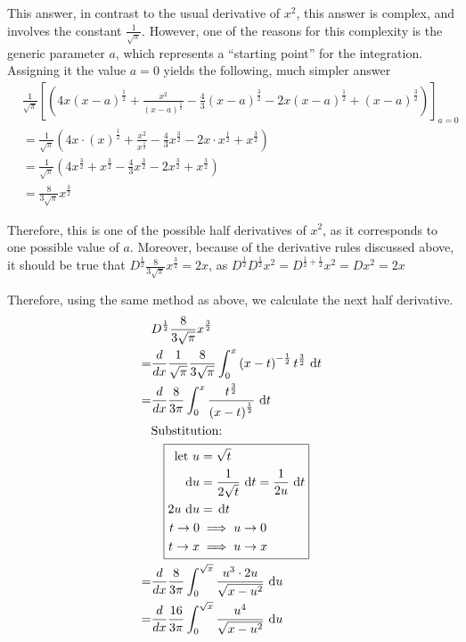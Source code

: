 \documentclass{article}
\DeclareMathOperator{\di}{\,d\!}
\newcommand*\Eval[3]{\left[#1\right]_{#2}^{#3}}
\newcommand{\IntSub}[1]{
{\textup{Substitution:}} \\
&\quad
\boxed{\begin{aligned}
		#1
\end{aligned}}
}
\begin{document}
This answer, in contrast to the usual derivative of $x^2$, this answer is
complex, and involves the constant $\frac{1}{\sqrt{\pi}}$. However, one of the
reasons for this complexity is the generic parameter $a$, which represents a
``starting point'' for the integration. Assigning it the value $a=0$ yields the following, much
simpler answer
\begin{align*}
	&\frac{1}{\sqrt{\pi}} \Eval{\left(4x\left(x-a\right)^\frac{1}{2} +
							   \frac{x^2}{\left(x-a\right)^\frac{1}{2}} -
							   \frac{4}{3}\left(x-a\right)^\frac{3}{2} -
							   2x\left(x-a\right)^\frac{1}{2} +
						       \left(x-a\right)^\frac{3}{2}\right)}
							   {a=0}{}\\
	&=\frac{1}{\sqrt{\pi}} \left(4x\cdot\left(x\right)^\frac{1}{2} +
							   \frac{x^2}{x^\frac{1}{2}} -
							   \frac{4}{3}x^\frac{3}{2} -
							   2x \cdot x^\frac{1}{2} +
						       x^\frac{3}{2}\right) \\
	&=\frac{1}{\sqrt{\pi}} \left(4x^\frac{3}{2} +
								 x^\frac{3}{2}-
							     \frac{4}{3}x^{\frac{3}{2}} -
								 2x^\frac{3}{2} +
						         x^\frac{3}{2}\right) \\
	&=\frac{8}{3\sqrt{\pi}} x^\frac{3}{2}
\end{align*}

Therefore, this is one of the possible half derivatives of $x^2$, as it
corresponds to one possible value of $a$. Moreover, because of the derivative rules
discussed above, it should be true that $D^\frac{1}{2}\frac{8}{3\sqrt{\pi}} x^\frac{3}{2} = 2x$,
as $D^\frac{1}{2}D^\frac{1}{2}x^2=D^{\frac{1}{2} + \frac{1}{2}} x^2=D x^2 = 2x$

Therefore, using the same method as above, we calculate the next half derivative.
\begin{align*}
	&D^\frac{1}{2} \frac{8}{3\sqrt{\pi}} x^\frac{3}{2} \\
	=&\frac{d}{dx}\frac{1}{\sqrt{\pi}} \frac{8}{3\sqrt{\pi}} \int_0^x \left(x-t\right)^{-\frac{1}{2}} t^\frac{3}{2} \di t \\
	=&\frac{d}{dx}\frac{8}{3\pi} \int_0^x \frac{t^\frac{3}{2}}{\left(x-t\right)^\frac{1}{2}} \di t \\
	 &\IntSub{
		 \text{let } u &= \sqrt{t} \\
		\di u &= \frac{1}{2\sqrt{t}} \di t = \frac{1}{2u} \di t \\
		2u \di u &= \di t \\
		t \to 0 &\implies u \to 0 \\
		t \to x &\implies u \to x
	} \\
	=&\frac{d}{dx}\frac{8}{3\pi} \int_0^{\sqrt{x}} \frac{u^3 \cdot 2u}{\sqrt{x-u^2}} \di u \\
	=&\frac{d}{dx}\frac{16}{3\pi} \int_0^{\sqrt{x}} \frac{u^4}{\sqrt{x-u^2}} \di u \\
\end{align*}
\end{document}
